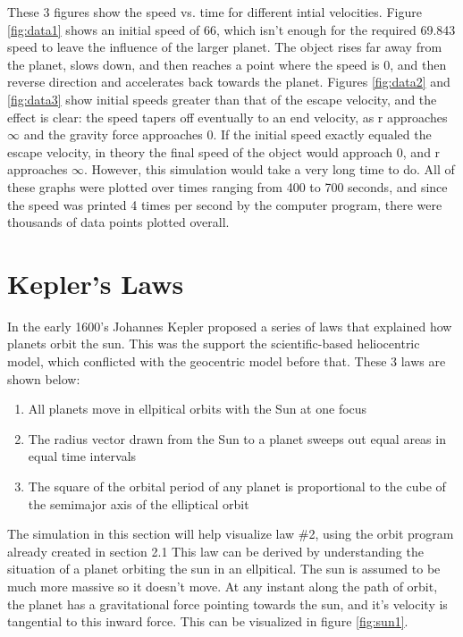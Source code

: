 These 3 figures show the speed vs. time for different intial velocities.  Figure \ref{fig:data1} shows an initial speed of 66, which isn't enough for the required 69.843 speed to leave the influence of the larger planet.  The object rises far away from the planet, slows down, and then reaches a point where the speed is 0, and then reverse direction and accelerates back towards the planet.  Figures \ref{fig:data2} and \ref{fig:data3} show initial speeds greater than that of the escape velocity, and the effect is clear: the speed tapers off eventually to an end velocity, as r approaches $\infty$ and the gravity force approaches 0.  If the initial speed exactly equaled the escape velocity, in theory the final speed of the object would approach 0, and r approaches $\infty$.  However, this simulation would take a very long time to do.  All of these graphs were plotted over times ranging from 400 to 700 seconds, and since the speed was printed 4 times per second by the computer program, there were thousands of data points plotted overall. 





\section{Kepler's Laws}




In the early 1600's Johannes Kepler proposed a series of laws that explained how planets orbit the sun.  This was the support the scientific-based heliocentric model, which conflicted with the geocentric model before that.  These 3 laws are shown below:



\begin{enumerate}
\item All planets move in ellpitical orbits with the Sun at one focus
\item The radius vector drawn from the Sun to a planet sweeps out equal areas in equal time intervals
\item The square of the orbital period of any planet is proportional to the cube of the semimajor axis of the elliptical orbit
\end{enumerate}

The simulation in this section will help visualize law \#2, using the orbit program already created in section 2.1  This law can be derived by understanding the situation of a planet orbiting the sun in an ellpitical.  The sun is assumed to be much more massive so it doesn't move.  At any instant along the path of orbit, the planet has a gravitational force pointing towards the sun, and it's velocity is tangential to this inward force.  This can be visualized in figure \ref{fig:sun1}.  

